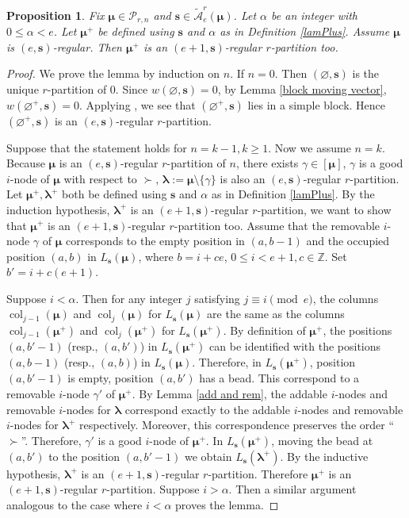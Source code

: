 \documentclass[a4paper,10pt]{amsart}
\theoremstyle{plain}
\newcommand{\bvarnothing}{{\boldsymbol \varnothing}}
\def\bs{{\boldsymbol{s}}}
\def\PP{\mathscr{P}}
\def\blam{{\boldsymbol \lambda}}
\def\bmu{{\boldsymbol \mu}}
\DeclareMathOperator{\col}{col}
\theoremstyle{plain}
\newtheorem{prop}[theorem]{Proposition}
\numberwithin{equation}{section}
\begin{document}
\begin{prop}\label{PlusRegular} Fix $\bmu\in\PP_{r,n}$ and $\bs\in\tilde{\mathcal{A}}_e^r(\bmu)$. Let $\alpha$ be an integer with $0\le \alpha<e$.
Let $\bmu^+$ be defined using $\bs$ and $\alpha$ as in Definition \ref{lamPlus}. Assume $\bmu$ is $(e,\bs)$-regular.  Then $\bmu^+$ is an $(e+1,\bs)$-regular $r$-partition too.
\end{prop}
\begin{proof} We prove the lemma by induction on $n$. If $n=0$. Then $(\bvarnothing,\bs)$ is the unique $r$-partition of $0$. Since $w(\bvarnothing,\bs)=0$, by Lemma \ref{block moving vector}, $w(\bvarnothing^+, \bs)=0$.  Applying \cite[Theorem 4.1]{F1}, we see that $(\bvarnothing^+, \bs)$ lies in a simple block.
Hence $(\bvarnothing^+, \bs)$ is an $(e,\mathbf{s})$-regular $r$-partition.

Suppose that the statement holds for $n = k - 1, k \ge 1$. Now we assume $n=k$. Because $\bmu$ is an $(e,\bs)$-regular $r$-partition of $n$, there exists $\gamma\in [\bmu]$, $\gamma$ is a good $i$-node of $\bmu$ with respect to $\succ$, $\blam:=\bmu\setminus\{\gamma\}$ is also an
$(e,\bs)$-regular $r$-partition. Let $\bmu^+,\blam^+$ both be defined using $\bs$ and $\alpha$ as in Definition \ref{lamPlus}. By the induction hypothesis, $\blam^+$ is an $(e+1,\mathbf{s})$-regular $r$-partition, we want to show that $\bmu^+$ is an $(e+1,\mathbf{s})$-regular $r$-partition too.
Assume that the removable $i$-node $\gamma$ of $\bmu$ corresponds to the empty position in $(a, b-1)$ and the occupied position $(a, b)$ in $L_\bs (\bmu)$, where $b=i+ce$, $0\leq i<e+1, c\in\mathbb{Z}$. Set $b'=i+c(e+1)$.

Suppose $i<\alpha$. Then for any integer $j$ satisfying $j\equiv i\pmod e$, the columns $\col_{j-1}(\bmu)$ and $\col_j(\bmu)$ for $L_\bs(\bmu)$ are the same as the columns $\col_{j-1}(\bmu^+)$ and $\col_j(\bmu^+)$ for $L_\bs(\bmu^+)$. By definition of $\bmu^+$, the positions $(a, b'-1)$ (resp., $(a, b')$) in $L_\bs (\bmu^+)$ can be identified with the positions $(a, b-1)$ (resp., $(a, b)$) in $L_\bs (\bmu)$. Therefore, in $L_\bs (\bmu^+)$, position $(a, b'-1)$ is empty, position $(a, b')$ has a bead. This correspond to a removable $i$-node $\gamma'$ of $\bmu^+$. By Lemma \ref{add and rem}, the addable $i$-nodes and removable $i$-nodes for $\blam$ correspond exactly to the addable $i$-nodes and removable $i$-nodes for $\blam^+$ respectively. Moreover, this correspondence preserves the order ``$\succ$''.
Therefore, $\gamma'$ is  a good $i$-node of $\bmu^+$.
In $L_\mathbf{s}(\boldsymbol{\mu}^+)$, moving the bead at $(a, b')$ to the position $(a, b'-1)$ we obtain $L_\mathbf{s}(\boldsymbol{\lambda}^+)$. By the inductive hypothesis, ${\blam}^+$ is an $(e+1,\bs)$-regular $r$-partition.
Therefore $\bmu^+$ is an $(e+1,\bs)$-regular $r$-partition. Suppose $i>\alpha$. Then a similar argument analogous to the case where $i < \alpha$ proves the lemma.


\end{proof}
\end{document}
